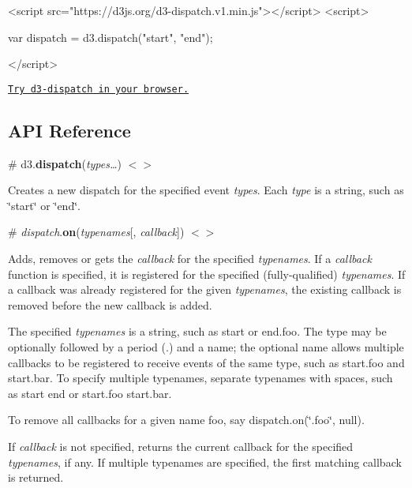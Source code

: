 \begin{DoxyCode}
<script src="https://d3js.org/d3-dispatch.v1.min.js"></script>
<script>

var dispatch = d3.dispatch("start", "end");

</script>
\end{DoxyCode}


\href{https://tonicdev.com/npm/d3-dispatch}{\tt Try d3-\/dispatch in your browser.}

\subsection*{A\+PI Reference}

\label{_dispatch}%
\# d3.{\bfseries dispatch}({\itshape types…}) \href{https://github.com/d3/d3-dispatch/blob/master/src/dispatch.js}{\tt $<$$>$}

Creates a new dispatch for the specified event {\itshape types}. Each {\itshape type} is a string, such as {\ttfamily \char`\"{}start\char`\"{}} or {\ttfamily \char`\"{}end\char`\"{}}.

\label{_dispatch_on}%
\# {\itshape dispatch}.{\bfseries on}({\itshape typenames}\mbox{[}, {\itshape callback}\mbox{]}) \href{https://github.com/d3/d3-dispatch/blob/master/src/dispatch.js#L26}{\tt $<$$>$}

Adds, removes or gets the {\itshape callback} for the specified {\itshape typenames}. If a {\itshape callback} function is specified, it is registered for the specified (fully-\/qualified) {\itshape typenames}. If a callback was already registered for the given {\itshape typenames}, the existing callback is removed before the new callback is added.

The specified {\itshape typenames} is a string, such as {\ttfamily start} or {\ttfamily end.\+foo}. The type may be optionally followed by a period ({\ttfamily .}) and a name; the optional name allows multiple callbacks to be registered to receive events of the same type, such as {\ttfamily start.\+foo} and {\ttfamily start.\+bar}. To specify multiple typenames, separate typenames with spaces, such as {\ttfamily start end} or {\ttfamily start.\+foo start.\+bar}.

To remove all callbacks for a given name {\ttfamily foo}, say {\ttfamily dispatch.\+on(\char`\"{}.\+foo\char`\"{}, null)}.

If {\itshape callback} is not specified, returns the current callback for the specified {\itshape typenames}, if any. If multiple typenames are specified, the first matching callback is returned.

